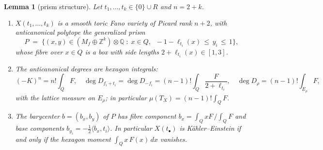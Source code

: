 \documentclass[11pt]{amsart}
\newtheorem{lemma}[theorem]{Lemma}
\theoremstyle{definition}
\theoremstyle{remark}
\newcommand{\ZZ}{\mathbb{Z}}
\newcommand{\QQ}{\mathbb{Q}}
\begin{document}
\begin{lemma}[prism structure]\label{lem:prism}
Let $t_1, \dots, t_k \in \{0\} \cup R$ and
$n = 2 + k$.
\begin{enumerate}
\item $X(t_1, \dots, t_k)$ is a smooth toric Fano variety of Picard rank
$n + 2$, with anticanonical polytope the generalized prism
\[
P \;=\; \bigl\{(x, y) \in (M_f \oplus \ZZ^k) \otimes \QQ \;:\;
x \in Q, \;\; -1 - \ell_{t_i}(x) \,\le\, y_i \,\le\, 1 \bigr\},
\]
whose fibre over $x \in Q$ is a box with side lengths
$2 + \ell_{t_i}(x) \in [1, 3]$.
\item The anticanonical degrees are hexagon integrals:
\[
(-K)^n = n! \int_Q F, \quad
\deg D_{f_i + t_i} = \deg D_{-f_i} = (n{-}1)! \int_Q \frac{F}{2 + \ell_{t_i}},
\quad
\deg D_\rho = (n{-}1)! \int_{E_\rho} F,
\]
with the lattice measure on $E_\rho$; in particular
$\mu(T_X) = (n-1)! \int_Q F$.
\item The barycenter $b = (b_x, b_y)$ of $P$ has fibre component
$b_x = \int_Q x F \,/ \int_Q F$ and base components
$b_{y_i} = -\tfrac12 \langle b_x, t_i \rangle$. In particular
$X(t_\bullet)$ is K\"ahler--Einstein if and only if the hexagon moment
$\int_Q x\, F(x)\, dx$ vanishes.
\end{enumerate}
\end{lemma}
\end{document}
